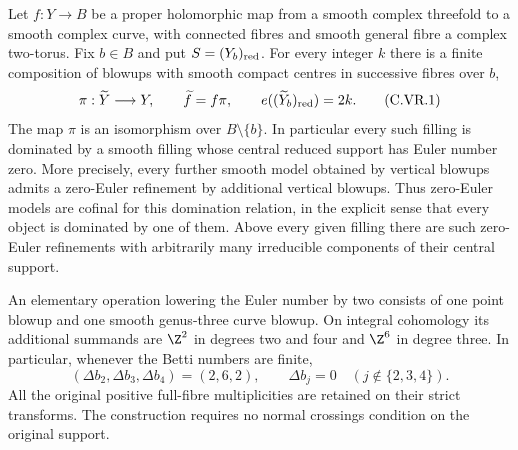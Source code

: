 
\begin{proposition}\label{cdp:st:C.2.UN.4}
Let $f:Y\to B$ be a proper holomorphic map from a smooth complex
threefold to a smooth complex curve, with connected fibres and smooth
general fibre a complex two-torus. Fix $b\in B$ and put
$S=(Y_b)_{\rm red}$. For every integer $k$ there is a finite composition
of blowups with smooth compact centres in successive fibres over $b$,
\[
 \pi:\widetilde Y\longrightarrow Y,\qquad
 \widetilde f=f\pi,\qquad
 e((\widetilde Y_b)_{\rm red})=2k.                 \tag{C.VR.1}\label{cdp:eq:C.VR.1}
\]
The map $\pi$ is an isomorphism over $B\setminus\{b\}$.
In particular every such filling is dominated by a smooth filling
whose central reduced support has Euler number zero. More precisely,
every further smooth model obtained by vertical blowups admits a
zero-Euler refinement by additional vertical blowups. Thus zero-Euler
models are cofinal for this domination relation, in the explicit sense
that every object is dominated by one of them.
Above every given filling there are such zero-Euler refinements with
arbitrarily many irreducible components of their central support.

An elementary operation lowering the Euler number by two consists of
one point blowup and one smooth genus-three curve blowup. On integral
cohomology its additional summands are $\Z^2$ in degrees two and four
and $\Z^6$ in degree three. In particular, whenever the Betti numbers
are finite,
\[
 (\Delta b_2,\Delta b_3,\Delta b_4)=(2,6,2),
 \qquad \Delta b_j=0\quad(j\notin\{2,3,4\}).       \tag{C.VR.2}\label{cdp:eq:C.VR.2}
\]
All the original positive full-fibre multiplicities are retained on
their strict transforms. The construction requires no normal crossings
condition on the original support.
\end{proposition}
